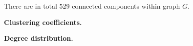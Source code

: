 \documentclass{article}
\newcommand{\authors}{}
\begin{document}
There are in total 529 connected components within graph \(G\).

\textbf{Clustering coefficients.}

\textbf{Degree distribution.}







%     

\end{document}
